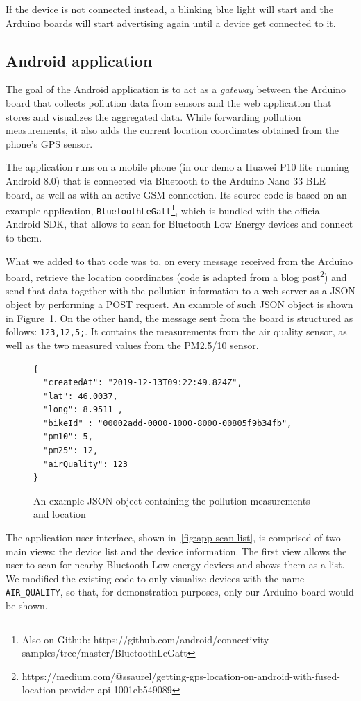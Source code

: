 \documentclass[12pt]{article}
\begin{document}
  If the device is not connected instead, a blinking blue light will start and the Arduino boards will start advertising again until a device get connected to it.
    


  \subsection{Android application}
  The goal of the Android application is to act as a \textit{gateway} between the Arduino board that collects pollution data from sensors and the web application that stores and visualizes the aggregated data. While forwarding pollution measurements, it also adds the current location coordinates obtained from the phone's GPS sensor.

  The application runs on a mobile phone (in our demo a Huawei P10 lite running Android 8.0) that is connected via Bluetooth to the Arduino Nano 33 BLE board, as well as with an active GSM connection.
  Its source code is based on an example application, \verb|BluetoothLeGatt|\footnote{Also on Github: https://github.com/android/connectivity-samples/tree/master/BluetoothLeGatt}, which is bundled with the official Android SDK, that allows to scan for Bluetooth Low Energy devices and connect to them. 

  What we added to that code was to, on every message received from the Arduino board, retrieve the location coordinates (code is adapted from a blog post\footnote{https://medium.com/@ssaurel/getting-gps-location-on-android-with-fused-location-provider-api-1001eb549089}) and send that data together with the pollution information to a web server as a JSON object by performing a POST request. An example of such JSON object is shown in Figure~\ref{lst:json-packet}. On the other hand, the message sent from the board is structured as follows: \verb|123,12,5;|. It contains the measurements from the air quality sensor, as well as the two measured values from the PM2.5/10 sensor.
  \begin{figure}[H]
    \centering
    \begin{verbatim}{
  "createdAt": "2019-12-13T09:22:49.824Z",
  "lat": 46.0037,
  "long": 8.9511 ,
  "bikeId" : "00002add-0000-1000-8000-00805f9b34fb",
  "pm10": 5,
  "pm25": 12,
  "airQuality": 123
}\end{verbatim}
  \caption{An example JSON object containing the pollution measurements and location}\label{lst:json-packet}
  \end{figure}
  The application user interface, shown in~\autoref{fig:app-scan-list}, is comprised of two main views: the device list and the device information.
  The first view allows the user to scan for nearby Bluetooth Low-energy devices and shows them as a list. We modified the existing code to only visualize devices with the name \verb|AIR_QUALITY|, so that, for demonstration purposes, only our Arduino board would be shown.
\end{document}

